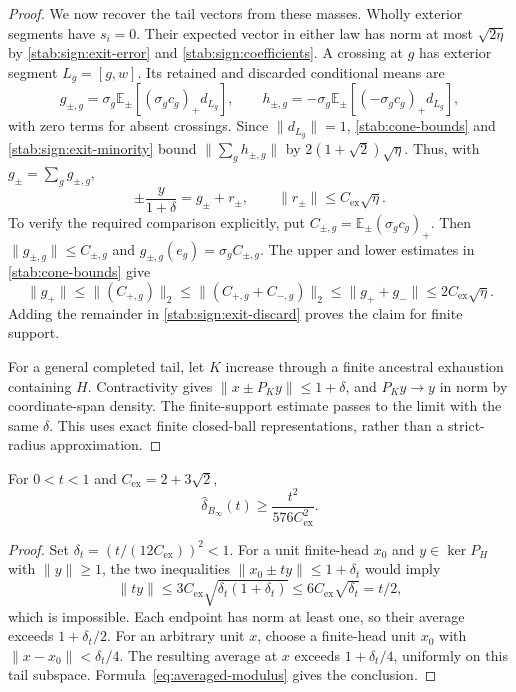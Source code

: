 \begin{proof}
We now recover the tail vectors from these masses. Wholly exterior
segments have $s_i=0$. Their expected vector in either law has norm
at most $\sqrt{2\eta}$ by \eqref{stab:sign:exit-error} and
\eqref{stab:sign:coefficients}. A crossing at $g$ has exterior
segment $L_g=[g,w]$. Its retained and discarded conditional means
are
\[
 g_{\pm,g}=\sigma_g\mathbb E_\pm
          [ (\sigma_g c_g)_+d_{L_g}],\qquad
 h_{\pm,g}=-\sigma_g\mathbb E_\pm
          [(-\sigma_g c_g)_+d_{L_g}],
\]
with zero terms for absent crossings. Since $\|d_{L_g}\|=1$,
\eqref{stab:cone-bounds} and
\eqref{stab:sign:exit-minority} bound
$\|\sum_gh_{\pm,g}\|$ by
$2(1+\sqrt2)\sqrt\eta$. Thus, with
$g_\pm=\sum_gg_{\pm,g}$,
\begin{equation}\label{stab:sign:exit-discard}
 \pm\frac{y}{1+\delta}=g_\pm+r_\pm,
 \qquad \|r_\pm\|\le C_{\mathrm{ex}}\sqrt\eta.
\end{equation}
To verify the required comparison explicitly, put
$C_{\pm,g}=\mathbb E_\pm(\sigma_gc_g)_+$. Then
$\|g_{\pm,g}\|\le C_{\pm,g}$ and
$g_{\pm,g}(e_g)=\sigma_gC_{\pm,g}$. The upper and lower
estimates in \eqref{stab:cone-bounds} give
\[
 \|g_+\|\le\|(C_{+,g})\|_2
 \le\|(C_{+,g}+C_{-,g})\|_2
 \le\|g_++g_-\|\le2C_{\mathrm{ex}}\sqrt\eta.
\]
Adding the remainder in \eqref{stab:sign:exit-discard} proves the
claim for finite support.

For a general completed tail, let $K$ increase through a finite
ancestral exhaustion containing $H$. Contractivity gives
$\|x\pm P_Ky\|\le1+\delta$, and $P_Ky\to y$ in norm by
coordinate-span density. The finite-support estimate passes to the
limit with the same $\delta$. This uses exact finite closed-ball
representations, rather than a strict-radius approximation.
\end{proof}

\begin{corollary}\label{stab:sign:exit-modulus}
For $0<t<1$ and $C_{\mathrm{ex}}=2+3\sqrt2$,
\[
 \widehat\delta_{B_\infty}(t)\ge\frac{t^2}{576C_{\mathrm{ex}}^2}.
\]
\end{corollary}

\begin{proof}
Set $\delta_t=(t/(12C_{\mathrm{ex}}))^2<1$. For a unit finite-head $x_0$
and $y\in\ker P_H$ with $\|y\|\ge1$, the two inequalities
$\|x_0\pm ty\|\le1+\delta_t$ would imply
\[
 \|ty\|\le3C_{\mathrm{ex}}\sqrt{\delta_t(1+\delta_t)}
       \le6C_{\mathrm{ex}}\sqrt{\delta_t}=t/2,
\]
which is impossible. Each endpoint has norm at least one, so their
average exceeds $1+\delta_t/2$. For an arbitrary unit $x$, choose
a finite-head unit $x_0$ with $\|x-x_0\|<\delta_t/4$.
The resulting average at $x$ exceeds $1+\delta_t/4$, uniformly
on this tail subspace. Formula~\eqref{eq:averaged-modulus}
gives the conclusion.
\end{proof}


